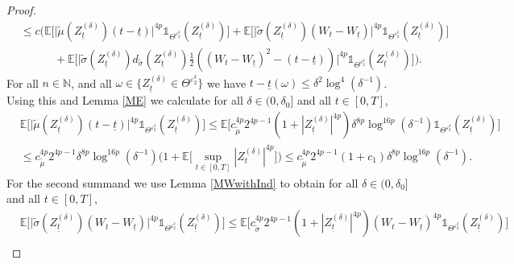 \documentclass[11pt,a4paper]{article}
\numberwithin{equation}{section}
\theoremstyle{definition}
\newcommand{\E}{{\mathbb{E}}}
\newcommand{\N}{{\mathbb{N}}}
\begin{document}
\begin{proof}
\begin{equation}
\begin{aligned}
            &\leq c\Big(\E\Big[ \big|\widetilde \mu(Z^{(\delta)}_{\underline t}) (t-\underline t) \big|^{4p} \mathds{1}_{\Theta^{\varepsilon_2^\delta}}(Z_{\underline t}^{(\delta)}) \Big]
            + \E\Big[  \big|\widetilde \sigma (Z^{(\delta)}_{\underline t}) (W_t- W_{\underline t})\big|^{4p} \mathds{1}_{\Theta^{\varepsilon_2^\delta}}(Z_{\underline t}^{(\delta)}) \Big]\\
            &\quad\quad\quad + \E\Big[  \big|\widetilde \sigma  (Z^{(\delta)}_{\underline t}) d_{\widetilde \sigma} (Z^{(\delta)}_{\underline t}) \frac{1}{2}((W_t-W_{\underline t})^2 -(t-\underline{t}))\big|^{4p} \mathds{1}_{\Theta^{\varepsilon_2^\delta}}(Z_{\underline t}^{(\delta)}) \Big]\Big).
        \end{aligned} 
    \end{equation}  
    For all $n\in\N$, and all $\omega\in\{ Z_{\underline t}^{(\delta)} \in \Theta^{\varepsilon_2^\delta}\}$ we have $t-\underline t(\omega) \leq \delta^2 \log^4(\delta^{-1})$. Using this and Lemma \ref{ME} we calculate for all $\delta\in(0,\delta_0]$ and all $t\in[0,T]$,
    \begin{equation}\label{ExepSeteq43}
        \begin{aligned}
            &\E\Big[ \big|\widetilde \mu(Z^{(\delta)}_{\underline t}) (t-\underline t) \big|^{4p} \mathds{1}_{\Theta^{\varepsilon_2^\delta}}(Z_{\underline{t}}^{(\delta)}) \Big]
            \leq \E\Big[c_{\widetilde \mu}^{4p} 2^{4p-1} (1+ |Z^{(\delta)}_{\underline t}|^{4p}) \delta^{8p} \log^{16p}(\delta^{-1}) \mathds{1}_{\Theta^{\varepsilon_2^\delta}}(Z_{\underline t}^{(\delta)}) \Big]\\
            &\leq c_{\widetilde \mu}^{4p} 2^{4p-1} \delta^{8p} \log^{16p}(\delta^{-1})  \Big(1+ \E\Big[ \sup_{t\in[0,T]} |Z^{(\delta)}_{t}|^{4p}\Big]\Big)
            \leq c_{\widetilde \mu}^{4p} 2^{4p-1} (1+ c_1) \delta^{8p} \log^{16p}(\delta^{-1}).
        \end{aligned} 
    \end{equation} 
    For the second summand we use Lemma \ref{MWwithInd} to obtain for all $\delta\in(0,\delta_0]$ and all $t\in[0,T]$,
    \begin{equation}\label{ExepSeteq44}
        \begin{aligned}
            &\E\Big[ \big|\widetilde \sigma (Z^{(\delta)}_{\underline t}) (W_t- W_{\underline t})\big|^{4p} \mathds{1}_{\Theta^{\varepsilon_2^\delta}}(Z_{\underline t}^{(\delta)})\Big]
            \leq \E\Big[  c_{\widetilde \sigma}^{4p} 2^{4p-1} (1+ |Z^{(\delta)}_{\underline t}|^{4p})  (W_t- W_{\underline t})^{4p} \mathds{1}_{\Theta^{\varepsilon_2^\delta}}(Z_{\underline t}^{(\delta)}) \Big]\\

\end{aligned}
\end{equation}
\end{proof}
\end{document}
